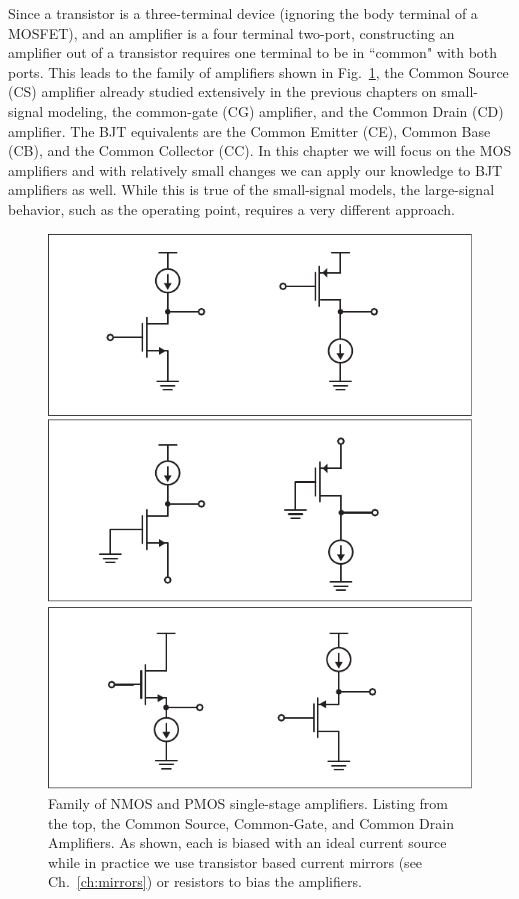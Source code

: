 Since a transistor is a three-terminal device (ignoring the body terminal of a MOSFET), and an amplifier is a four terminal two-port, constructing an amplifier out of a transistor requires one terminal to be in ``common" with both ports.  This leads to the family of amplifiers shown in Fig.~\ref{fig:ampchart}, the Common Source (CS) amplifier already studied extensively in the previous chapters on small-signal modeling, the common-gate (CG) amplifier, and the Common Drain (CD) amplifier.  The BJT equivalents are the Common Emitter (CE), Common Base (CB), and the Common Collector (CC).  In this chapter we will focus on the MOS amplifiers and with relatively small changes we can apply our knowledge to BJT amplifiers as well.  While this is true of the small-signal models, the large-signal behavior, such as the operating point, requires a very different approach.



\begin{figure}[tb]
\begin{center}
\includegraphics[scale=.75]{ampchart}
\end{center}
\caption{Family of NMOS and PMOS single-stage amplifiers.  Listing from the top, the Common Source, Common-Gate, and Common Drain Amplifiers.  As shown, each is biased with an ideal current source while in practice we use transistor based current mirrors (see Ch.~\ref{ch:mirrors}) or resistors to bias the amplifiers.} \label{fig:ampchart}
\end{figure}


